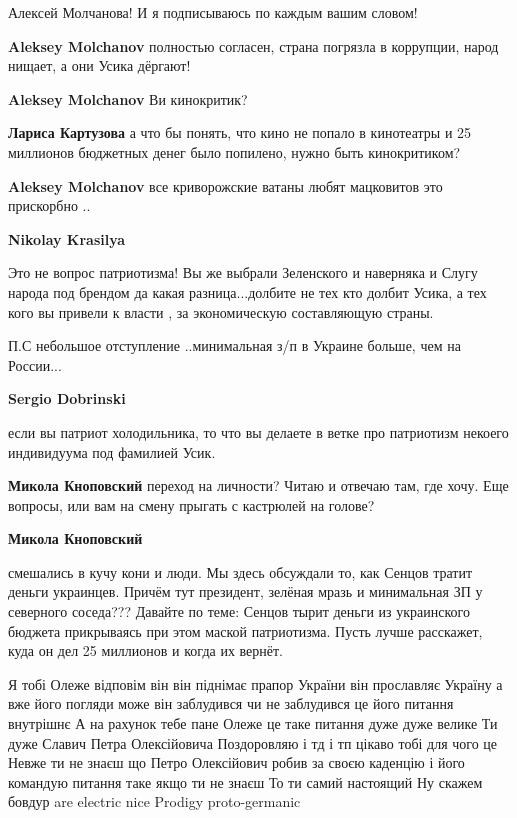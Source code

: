 \begin{itemize}
\begin{itemize}
Алексей Молчанова! И я подписываюсь по каждым вашим словом!

\textbf{Aleksey Molchanov} полностью согласен, страна погрязла в коррупции, народ нищает, а они Усика дёргают!

\textbf{Aleksey Molchanov} Ви кинокритик?

\textbf{Лариса Картузова} а что бы понять, что кино не попало в кинотеатры и 25 миллионов бюджетных денег было попилено, нужно быть кинокритиком?

\textbf{Aleksey Molchanov} все криворожские ватаны любят мацковитов это прискорбно ..

\textbf{Nikolay Krasilya} 

Это не вопрос патриотизма! Вы же выбрали Зеленского и наверняка и Слугу народа
под брендом да какая разница...долбите не тех кто долбит Усика, а тех кого вы
привели к власти , за экономическую составляющую страны.

П.С небольшое отступление ..минимальная з/п в Украине больше, чем на России...

\textbf{Sergio Dobrinski} 

если вы патриот холодильника, то что вы делаете в ветке про патриотизм некоего
индивидуума под фамилией Усик.

\textbf{Микола Кноповский} переход на личности? Читаю и отвечаю там, где хочу. Еще вопросы, или вам на смену прыгать с кастрюлей на голове?

\textbf{Микола Кноповский} 

смешались в кучу кони и люди. Мы здесь обсуждали то, как Сенцов тратит деньги
украинцев. Причём тут президент, зелёная мразь и минимальная ЗП у северного
соседа??? Давайте по теме: Сенцов тырит деньги из украинского бюджета
прикрываясь при этом маской патриотизма. Пусть лучше расскажет, куда он дел 25
миллионов и когда их вернёт.

\end{itemize} %


Я тобі Олеже відповім він він піднімає прапор України він прославляє Україну а
вже його погляди може він заблудився чи не заблудився це його питання внутрішнє
А на рахунок тебе пане Олеже це таке питання дуже дуже велике Ти дуже Славич
Петра Олексійовича Поздоровляю і тд і тп цікаво тобі для чого це Невже ти не
знаєш що Петро Олексійович робив за своєю каденцію і його командую питання таке
якщо ти не знаєш То ти самий настоящий Ну скажем бовдур are electric nice
Prodigy proto-germanic


\end{itemize}
